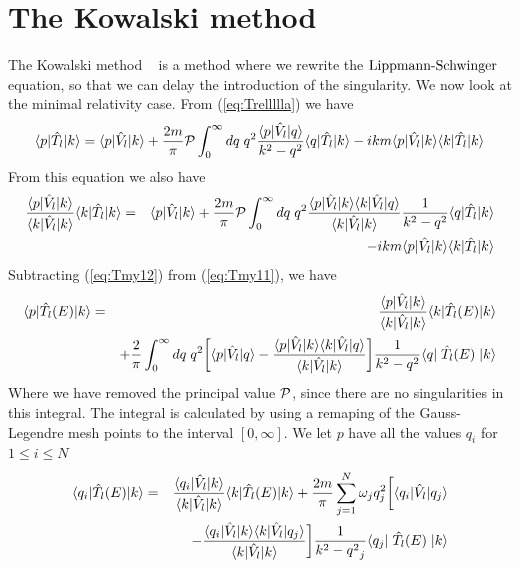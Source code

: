 \section{The Kowalski method}
The Kowalski method
~\cite{Kowalski}
is a method where we rewrite the $\text{Lippmann-Schwinger}$ equation, so that we can delay the introduction of the singularity.
We now look at the minimal relativity case. From (\ref{eq:Trellllla}) we have
\begin{equation}\label{eq:Tmy11}
\braketm{{ p}} {\op{T}_l}{{ k}} =\braketm{{ p}}{\op{V}_l}{{ k}}
+ \frac{2m}{\pi}{\cal P}\int^{\infty}_{0}d { q}\; q^2 \frac{\bra{{ p}}\op{V}_l\ket{{ q}}}
{k^2- q^2}  \bra{{ q}} \op{T}_l\ket{{ k}}
-i { k}m \bra{{ p}}\op{V_l}\ket{{ k}}\bra{{ k}}\op{T}_l\ket{{ k}}  
\end{equation}
From this equation we also have
\begin{eqnarray}\label{eq:Tmy12}
\frac{\braketm{ p}{\op{V}_l}{ k} }{\braketm{ k}{\op{V}_l}{ k} }\braketm{ k}{\op{T}_l}{ k} 
&=&
\braketm{{ p}}{\op{V}_l}{{ k}}
+ \frac{2m}{\pi}{\cal P}\int^{\infty}_{0}d { q}\; q^2
\frac{\bra{{ p}}\op{V}_l\ket{{ k}}\braketm{{ k}}{\op{V}_l}{{ q}} }{\braketm{{ k}}{\op{V}_l}{{ k}} } 
\inv{k^2- q^2}  \bra{{ q}} \op{T}_l\ket{{ k}}\nonumber\\
&&
-i { k}m \bra{{ p}}\op{V_l}\ket{{ k}}\bra{{ k}}\op{T}_l\ket{{ k}}  
\end{eqnarray}
Subtracting (\ref{eq:Tmy12}) from (\ref{eq:Tmy11}), we have
\begin{eqnarray}\label{eq:Tmy113}
\braketm{{ p}} {\op{T}_l(E)}{{ k}} &=&
\frac{\braketm{ p}{\op{V}_l}{ k} }{\braketm{ k}{\op{V}_l}{ k} }\braketm{ k}{\op{T}_l(E)}{ k}\\%
&&
+ \frac{2}{\pi}\int^{\infty}_{0}d { q}\; q^2 \bigg[\bra{{ p}}\op{V}_l\ket{{ q}}-
\frac{\bra{{ p}}\op{V}_l\ket{{ k}}\braketm{{ k}}{\op{V}_l}{{ q}} }{\braketm{{ k}}{\op{V}_l}{{ k}} }\bigg] 
\inv{{k^2- q^2}}  \bra{{ q}} \;\op{T}_l(E)\;\ket{{ k}}\nonumber
\end{eqnarray}
Where we have removed the principal value ${\cal P}$, since there are no singularities in this integral.
The integral is calculated by using a remaping of  the Gauss-Legendre mesh points
to the interval $[0,\infty]$. We let $p$ have all the values $q_i$ for $1\le i\le N$
\begin{eqnarray}\label{eq:Tmy1134}
\braketm{{ q_i}} {\op{T}_l(E)}{{ k}} &=&
\frac{\braketm{ q_i}{\op{V}_l}{ k} }{\braketm{ k}{\op{V}_l}{ k} }\braketm{ k}{\op{T}_l(E)}{ k}%
+ \frac{2m}{\pi}\sum^N_{j=1}\omega_j q^2_j \bigg[\bra{{ q_i}}\op{V}_l\ket{{{ q}_j}}\nonumber\\
&&
-\frac{\bra{{ q_i}}\op{V}_l\ket{{ k}}\braketm{{ k}}{\op{V}_l}{{ q_j}} }{\braketm{{ k}}{\op{V}_l}{{ k}} }\bigg]
\inv{ k^2-{{ q^2}_j}}  \bra{{ q_j}} \;\op{T}_l(E)\;\ket{{ k}}%
\end{eqnarray}
